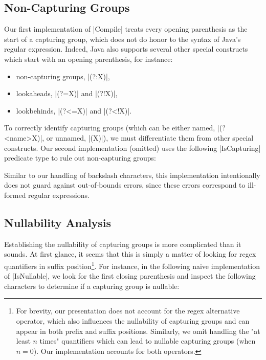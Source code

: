 \subsection{Non-Capturing Groups}
\label{subsec:non-capturing-groups}

Our first implementation of |Compile| treats every opening parenthesis as the start of a capturing group, which does not do honor to the syntax of Java's regular expression.
Indeed, Java also supports several other special constructs which start with an opening parenthesis, for instance:

\begin{itemize}
  \item non-capturing groups, |(?:X)|,
  \item lookaheads, |(?=X)| and |(?!X)|,
  \item lookbehinds, |(?<=X)| and |(?<!X)|.
\end{itemize}

\noindent
To correctly identify capturing groups (which can be either named, |(?<name>X)|, or unnamed, |(X)|), we must differentiate them from other special constructs.
Our second implementation (omitted) uses the following |IsCapturing| predicate type to rule out non-capturing groups:

\regexIsCapturing

\noindent
Similar to our handling of backslash characters, this implementation intentionally does not guard against out-of-bounds errors, since these errors correspond to ill-formed regular expressions.

\subsection{Nullability Analysis}

Establishing the nullability of capturing groups is more complicated than it sounds.
At first glance, it seems that this is simply a matter of looking for regex quantifiers in suffix position\footnote{
For brevity, our presentation does not account for the regex alternative operator, which also influences the nullability of capturing groups and can appear in both prefix and suffix positions.
Similarly, we omit handling the "at least $n$ times" quantifiers which can lead to nullable capturing groups (when $n=0$).
Our implementation accounts for both operators.
}.
For instance, in the following naive implementation of |IsNullable|, we look for the first closing parenthesis and inspect the following characters to determine if a capturing group is nullable:

